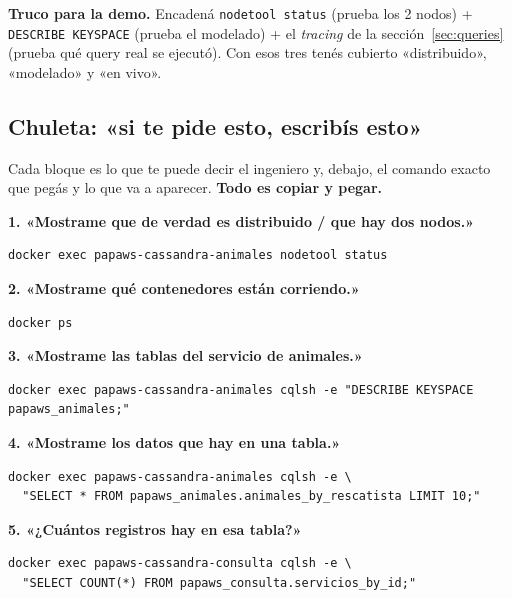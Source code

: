 \documentclass[11pt,a4paper]{article}
\begin{document}
\begin{nota}
\textbf{Truco para la demo.} Encadená \texttt{nodetool status} (prueba los 2 nodos) +
\texttt{DESCRIBE KEYSPACE} (prueba el modelado) + el \emph{tracing} de la
sección~\ref{sec:queries} (prueba qué query real se ejecutó). Con esos tres tenés
cubierto «distribuido», «modelado» y «en vivo».
\end{nota}

\subsection{Chuleta: «si te pide esto, escribís esto»}
Cada bloque es lo que te puede decir el ingeniero y, debajo, el comando exacto que
pegás y lo que va a aparecer. \textbf{Todo es copiar y pegar.}

\medskip
\noindent\textbf{1. «Mostrame que de verdad es distribuido / que hay dos nodos.»}
\begin{lstlisting}[style=shell]
docker exec papaws-cassandra-animales nodetool status
\end{lstlisting}

\medskip
\noindent\textbf{2. «Mostrame qué contenedores están corriendo.»}
\begin{lstlisting}[style=shell]
docker ps
\end{lstlisting}

\medskip
\noindent\textbf{3. «Mostrame las tablas del servicio de animales.»}
\begin{lstlisting}[style=shell]
docker exec papaws-cassandra-animales cqlsh -e "DESCRIBE KEYSPACE papaws_animales;"
\end{lstlisting}

\medskip
\noindent\textbf{4. «Mostrame los datos que hay en una tabla.»}
\begin{lstlisting}[style=shell]
docker exec papaws-cassandra-animales cqlsh -e \
  "SELECT * FROM papaws_animales.animales_by_rescatista LIMIT 10;"
\end{lstlisting}

\medskip
\noindent\textbf{5. «¿Cuántos registros hay en esa tabla?»}
\begin{lstlisting}[style=shell]
docker exec papaws-cassandra-consulta cqlsh -e \
  "SELECT COUNT(*) FROM papaws_consulta.servicios_by_id;"
\end{lstlisting}
\end{document}
